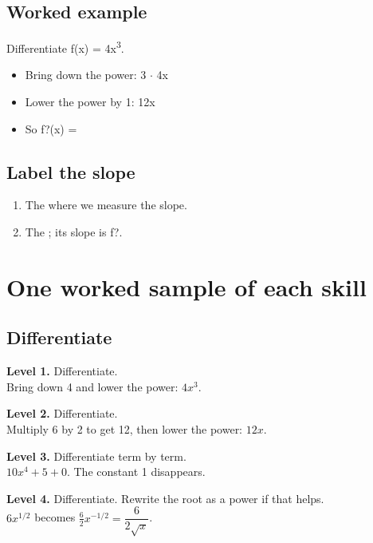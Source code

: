 \documentclass[11pt]{article}
\begin{document}
\subsection*{Worked example}
Differentiate f(x) = 4x\textsuperscript{3}.\\
\begin{itemize}
\item Bring down the power: 3 $\cdot$ 4x
\item Lower the power by 1: 12x
\item So f?(x) = 
\end{itemize}
\subsection*{Label the slope}
\begin{enumerate}
\item The  where we measure the slope.
\item The ; its slope is f?.
\end{enumerate}
\section*{One worked sample of each skill}
\subsection*{Differentiate}
\noindent\textbf{Level 1.} Differentiate.\\  \quad Bring down 4 and lower the power: $4x^{3}$.\par\medskip
\noindent\textbf{Level 2.} Differentiate.\\  \quad Multiply 6 by 2 to get 12, then lower the power: $12x$.\par\medskip
\noindent\textbf{Level 3.} Differentiate term by term.\\  \quad $10x^{4}+5+0$. The constant 1 disappears.\par\medskip
\noindent\textbf{Level 4.} Differentiate. Rewrite the root as a power if that helps.\\  \quad $6x^{1/2}$ becomes $\tfrac{6}{2}x^{-1/2}=\dfrac{6}{2\sqrt{x}}$.\par\medskip
\end{document}
